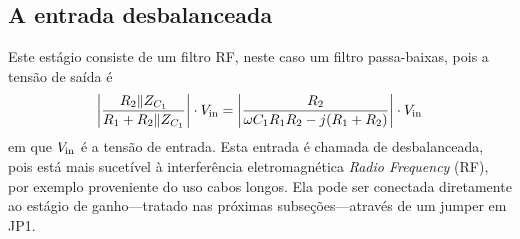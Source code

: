 \documentclass[12pt, a4paper, leqno, twoside]{book}
\begin{document}
  \subsection{A entrada desbalanceada}

  Este est\'agio consiste de um filtro RF, neste caso um filtro passa-baixas, pois a tens\~ao de sa\'ida \'e 
  \begin{equation}
    \bigg|{R_2\|Z_{C_1}\over R_1+R_2\|Z_{C_1}}\bigg|\cdot V_{\rm in}=\bigg|{R_2\over\omega C_1R_1R_2-j(R_1+R_2)}\bigg|\cdot V_{\rm in}
  \end{equation}
  em que $V_{\rm in}$ \'e a tens\~ao de entrada. Esta entrada \'e chamada de desbalanceada, pois est\'a mais sucet\'ivel \`a interfer\^encia eletromagn\'etica {\it Radio Frequency} (RF), por exemplo proveniente do uso cabos longos. Ela pode ser conectada diretamente ao est\'agio de ganho---tratado nas pr\'oximas subse\c c\~oes---atrav\'es de um jumper em JP1. 
\end{document}
